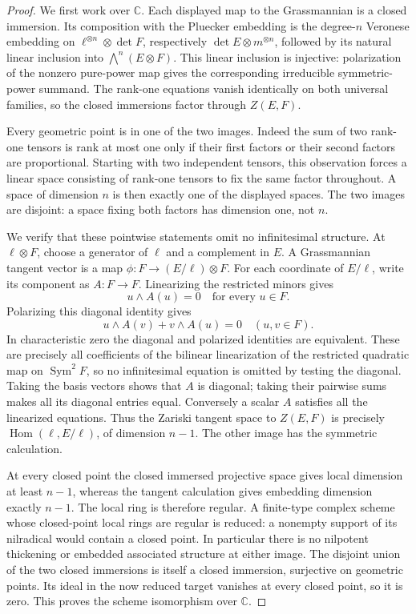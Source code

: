 \documentclass[11pt,reqno]{amsart}
\numberwithin{equation}{section}
\theoremstyle{definition}\newtheorem{definition}[theorem]{Definition}
\theoremstyle{remark}\newtheorem{remark}[theorem]{Remark}
\newcommand{\C}{\mathbb C}\newcommand{\Q}{\mathbb Q}
\DeclareMathOperator{\Sym}{Sym}\DeclareMathOperator{\Gr}{Gr}
\DeclareMathOperator{\Hom}{Hom}\DeclareMathOperator{\Tot}{Tot}
\begin{document}
\begin{proof}
We first work over \(\C\).  Each displayed map to the
Grassmannian is a closed immersion.  Its composition with the
Pluecker embedding is the degree-\(n\) Veronese embedding on
\(\ell^{\otimes n}\otimes\det F\), respectively
\(\det E\otimes m^{\otimes n}\), followed by its natural linear
inclusion into \(\bigwedge^n(E\otimes F)\).  This linear inclusion
is injective: polarization of the nonzero pure-power map gives the
corresponding irreducible symmetric-power summand.  The rank-one
equations vanish identically on both universal families, so the
closed immersions factor through \(Z(E,F)\).

Every geometric point is in one of the two images.  Indeed the sum
of two rank-one tensors is rank at most one only if their first
factors or their second factors are proportional.  Starting with two
independent tensors, this observation forces a linear space consisting
of rank-one tensors to fix the same factor throughout.  A space of
dimension \(n\) is then exactly one of the displayed spaces.
The two images are disjoint: a space fixing both factors has dimension
one, not \(n\).

We verify that these pointwise statements omit no infinitesimal
structure.  At \(\ell\otimes F\), choose a generator of \(\ell\)
and a complement in \(E\).  A Grassmannian tangent vector is a map
\(\phi:F\to(E/\ell)\otimes F\).  For each coordinate of
\(E/\ell\), write its component as \(A:F\to F\).
Linearizing the restricted minors gives
\[
                       u\wedge A(u)=0\quad\text{for every }u\in F.
\]
Polarizing this diagonal identity gives
\[
               u\wedge A(v)+v\wedge A(u)=0\quad(u,v\in F).
\]
In characteristic zero the diagonal and polarized identities are
equivalent.  These are precisely all coefficients of the bilinear
linearization of the restricted quadratic map on \(\Sym^2F\),
so no infinitesimal equation is omitted by testing the diagonal.
Taking the basis vectors shows that \(A\) is diagonal; taking their
pairwise sums makes all its diagonal entries equal.  Conversely a
scalar \(A\) satisfies all the linearized equations.  Thus the
Zariski tangent space to \(Z(E,F)\) is precisely
\(\Hom(\ell,E/\ell)\), of dimension \(n-1\).
The other image has the symmetric calculation.

At every closed point the closed immersed projective space gives
local dimension at least \(n-1\), whereas the tangent calculation
gives embedding dimension exactly \(n-1\).  The local ring is
therefore regular.  A finite-type complex scheme whose closed-point
local rings are regular is reduced: a nonempty support of its
nilradical would contain a closed point.  In particular there is no
nilpotent thickening or embedded associated structure at either
image.  The disjoint union of the two closed immersions is itself a
closed immersion, surjective on geometric points.  Its ideal in the
now reduced target vanishes at every closed point, so it is zero.
This proves the scheme isomorphism over \(\C\).


\end{proof}
\end{document}
